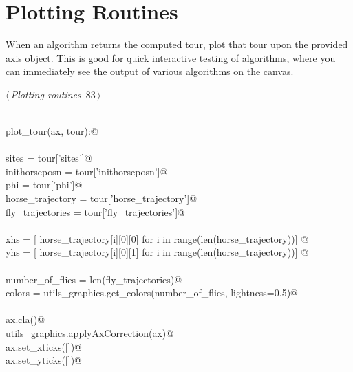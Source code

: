 \documentclass[11.5pt]{report}
\begin{document}
\section{Plotting Routines}
\newchunk When an algorithm returns the computed tour, plot that tour upon the provided axis object. 
This is good for quick interactive testing of algorithms, where you can immediately see the output of various
algorithms on the canvas. 
\begin{flushleft} \small
\begin{minipage}{\linewidth}\label{scrap133}\raggedright\small
{} $\langle\,${\itshape Plotting routines}\nobreak\ {\footnotesize {83}}$\,\rangle\equiv$
\vspace{-1ex}
\begin{list}{}{} \item
\mbox{}\verb@@\\
\mbox{}\verb@def plot_tour(ax, tour):@\\
\mbox{}\verb@@\\
\mbox{}\verb@    sites            = tour['sites']@\\
\mbox{}\verb@    inithorseposn    = tour['inithorseposn']@\\
\mbox{}\verb@    phi              = tour['phi']@\\
\mbox{}\verb@    horse_trajectory = tour['horse_trajectory']@\\
\mbox{}\verb@    fly_trajectories = tour['fly_trajectories']@\\
\mbox{}\verb@@\\
\mbox{}\verb@    xhs = [ horse_trajectory[i][0][0] for i in range(len(horse_trajectory))]    @\\
\mbox{}\verb@    yhs = [ horse_trajectory[i][0][1] for i in range(len(horse_trajectory))]    @\\
\mbox{}\verb@@\\
\mbox{}\verb@    number_of_flies = len(fly_trajectories)@\\
\mbox{}\verb@    colors          = utils_graphics.get_colors(number_of_flies, lightness=0.5)@\\
\mbox{}\verb@@\\
\mbox{}\verb@    ax.cla()@\\
\mbox{}\verb@    utils_graphics.applyAxCorrection(ax)@\\
\mbox{}\verb@    ax.set_xticks([])@\\
\mbox{}\verb@    ax.set_yticks([])@\\
\mbox{}\verb@@\\

\end{list}
\end{minipage}
\end{flushleft}
\end{document}
